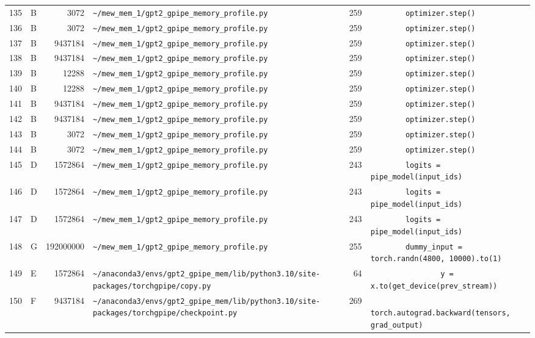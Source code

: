 \documentclass{article}
\begin{document}
\begin{longtable}{r l r p{6.5cm} r p{7.0cm}}
135 & B & 3072 & \lstinline|~/mew_mem_1/gpt2_gpipe_memory_profile.py| & 259 & \lstinline|        optimizer.step()| \\
136 & B & 3072 & \lstinline|~/mew_mem_1/gpt2_gpipe_memory_profile.py| & 259 & \lstinline|        optimizer.step()| \\
137 & B & 9437184 & \lstinline|~/mew_mem_1/gpt2_gpipe_memory_profile.py| & 259 & \lstinline|        optimizer.step()| \\
138 & B & 9437184 & \lstinline|~/mew_mem_1/gpt2_gpipe_memory_profile.py| & 259 & \lstinline|        optimizer.step()| \\
139 & B & 12288 & \lstinline|~/mew_mem_1/gpt2_gpipe_memory_profile.py| & 259 & \lstinline|        optimizer.step()| \\
140 & B & 12288 & \lstinline|~/mew_mem_1/gpt2_gpipe_memory_profile.py| & 259 & \lstinline|        optimizer.step()| \\
141 & B & 9437184 & \lstinline|~/mew_mem_1/gpt2_gpipe_memory_profile.py| & 259 & \lstinline|        optimizer.step()| \\
142 & B & 9437184 & \lstinline|~/mew_mem_1/gpt2_gpipe_memory_profile.py| & 259 & \lstinline|        optimizer.step()| \\
143 & B & 3072 & \lstinline|~/mew_mem_1/gpt2_gpipe_memory_profile.py| & 259 & \lstinline|        optimizer.step()| \\
144 & B & 3072 & \lstinline|~/mew_mem_1/gpt2_gpipe_memory_profile.py| & 259 & \lstinline|        optimizer.step()| \\
145 & D & 1572864 & \lstinline|~/mew_mem_1/gpt2_gpipe_memory_profile.py| & 243 & \lstinline|        logits = pipe_model(input_ids)| \\
146 & D & 1572864 & \lstinline|~/mew_mem_1/gpt2_gpipe_memory_profile.py| & 243 & \lstinline|        logits = pipe_model(input_ids)| \\
147 & D & 1572864 & \lstinline|~/mew_mem_1/gpt2_gpipe_memory_profile.py| & 243 & \lstinline|        logits = pipe_model(input_ids)| \\
148 & G & 192000000 & \lstinline|~/mew_mem_1/gpt2_gpipe_memory_profile.py| & 255 & \lstinline|        dummy_input = torch.randn(4800, 10000).to(1)| \\
149 & E & 1572864 & \lstinline|~/anaconda3/envs/gpt2_gpipe_mem/lib/python3.10/site-packages/torchgpipe/copy.py| & 64 & \lstinline|                y = x.to(get_device(prev_stream))| \\
150 & F & 9437184 & \lstinline|~/anaconda3/envs/gpt2_gpipe_mem/lib/python3.10/site-packages/torchgpipe/checkpoint.py| & 269 & \lstinline|            torch.autograd.backward(tensors, grad_output)| \\

\end{longtable}
\end{document}
